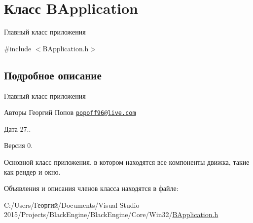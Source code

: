 \hypertarget{class_b_application}{}\section{Класс B\+Application}
\label{class_b_application}


Главный класс приложения  




{\ttfamily \#include $<$B\+Application.\+h$>$}



\subsection{Подробное описание}
Главный класс приложения 

\begin{DoxyAuthor}{Авторы}
Георгий Попов \href{mailto:popoff96@live.com}{\tt popoff96@live.\+com} 
\end{DoxyAuthor}
\begin{DoxyDate}{Дата}
27.. 
\end{DoxyDate}
\begin{DoxyVersion}{Версия}
0.
\end{DoxyVersion}
Основной класс приложения, в котором находятся все компоненты движка, такие как рендер и окно. 

Объявления и описания членов класса находятся в файле\+:\begin{DoxyCompactItemize}
\item 
C\+:/\+Users/Георгий/\+Documents/\+Visual Studio 2015/\+Projects/\+Black\+Engine/\+Black\+Engine/\+Core/\+Win32/\hyperlink{_b_application_8h}{B\+Application.\+h}\end{DoxyCompactItemize}
